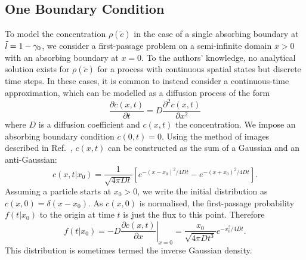 \subsection{One Boundary Condition}
To model the concentration $\rho(\tilde{c})$ in the case of a single absorbing boundary at $\tilde{l} = 1-\gamma_0$, we consider a first-passage problem on a semi-infinite domain $x>0$ with an absorbing boundary at $x=0$. To the authors’ knowledge, no analytical solution exists for $\rho(\tilde{c})$ for a process with continuous spatial states but discrete time steps. In these cases, it is common to instead consider a continuous-time approximation, which can be modelled as a diffusion process of the form
\begin{equation}
    \frac{\partial c(x, t)}{\partial t} = D \frac{\partial^2 c(x, t)}{\partial x^2}
\end{equation}
where $D$ is a diffusion coefficient and $c(x,t)$ the concentration. We impose an absorbing boundary condition $c(0, t) = 0$. Using the method of images described in Ref.~\cite{Redner_2001}, $c(x, t)$ can be constructed as the sum of a Gaussian and an
anti-Gaussian:
\begin{equation}
    c(x, t|x_0)=\frac{1}{\sqrt{4 \pi D t}} \left[ e^{-(x-x_0)^2/4Dt} - e^{-(x+x_0)^2/4Dt}\right].
\end{equation}
Assuming a particle starts at $x_0>0$, we write the initial distribution as $c(x, 0)=\delta(x-x_0)$. As $c(x, 0)$ is normalised, the first-passage probability $f(t|x_0)$ to the origin at time $t$ is just the flux to this point. Therefore
\begin{equation}
    f(t|x_0) = -D \left. \frac{\partial c(x,t)}{\partial x}\right|_{x=0} = \frac{x_0}{\sqrt{4\pi Dt^3}}e^{-x_0^2/{4Dt}}.
\end{equation}
This distribution is sometimes termed the inverse Gaussian density. 

